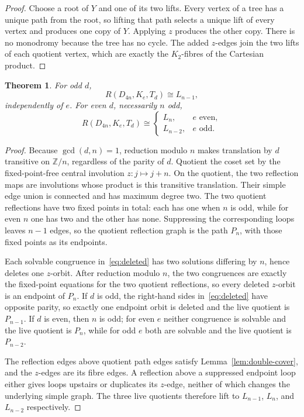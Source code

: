 \documentclass[11pt]{article}
\newtheorem{theorem}{Theorem}[section]
\theoremstyle{definition}
\theoremstyle{remark}
\newcommand{\Z}{\mathbb{Z}}
\begin{document}
\begin{proof}
Choose a root of $Y$ and one of its two lifts. Every vertex of a tree has a unique path from the
root, so lifting that path selects a unique lift of every vertex and produces one copy of $Y$.
Applying $z$ produces the other copy. There is no monodromy because the tree has no cycle. The added
$z$-edges join the two lifts of each quotient vertex, which are exactly the $K_2$-fibres of the
Cartesian product.
\end{proof}

\begin{theorem}
\label{thm:reflection-template}
For odd $d$,
\begin{equation}
  R(D_{4n},K_e,T_d)\cong L_{n-1},
  \label{eq:refl-odd}
\end{equation}
independently of $e$. For even $d$, necessarily $n$ odd,
\begin{equation}
  R(D_{4n},K_e,T_d)\cong
  \begin{cases}
    L_n, & e\text{ even},\\
    L_{n-2}, & e\text{ odd}.
  \end{cases}
  \label{eq:refl-even}
\end{equation}
\end{theorem}

\begin{proof}
Because $\gcd(d,n)=1$, reduction modulo $n$ makes translation by $d$ transitive on $\Z/n$,
regardless of the parity of $d$. Quotient the coset set by the fixed-point-free central involution
$z:j\mapsto j+n$. On the quotient, the two reflection maps are involutions whose product is this
transitive translation. Their simple edge union is connected and has maximum degree two. The two
quotient reflections have two fixed points in total: each has one when $n$ is odd, while for even
$n$ one has two and the other has none. Suppressing the corresponding loops leaves $n-1$ edges, so
the quotient reflection graph is the path $P_n$, with those fixed points as its endpoints.

Each solvable congruence in~\eqref{eq:deleted} has two solutions differing by $n$, hence deletes one
$z$-orbit. After reduction modulo $n$, the two congruences are exactly the fixed-point equations for
the two quotient reflections, so every deleted $z$-orbit is an endpoint of $P_n$. If $d$ is odd, the
right-hand sides in~\eqref{eq:deleted} have opposite parity, so exactly one endpoint orbit is
deleted and the live quotient is $P_{n-1}$. If $d$ is even, then $n$ is odd; for even $e$ neither
congruence is solvable and the live quotient is $P_n$, while for odd $e$ both are solvable and the
live quotient is $P_{n-2}$.

The reflection edges above quotient path edges satisfy Lemma~\ref{lem:double-cover}, and the
$z$-edges are its fibre edges. A reflection above a suppressed endpoint loop either gives loops
upstairs or duplicates its $z$-edge, neither of which changes the underlying simple graph. The three
live quotients therefore lift to $L_{n-1}$, $L_n$, and $L_{n-2}$ respectively.
\end{proof}
\end{document}
